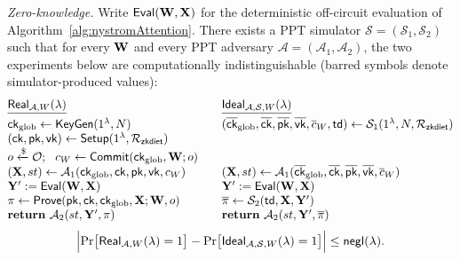 \documentclass[runningheads]{llncs}
\begin{document}
\noindent\emph{Zero-knowledge.}
Write $\mathsf{Eval}({\mathbf{W}}, {\mathbf{X}})$ for the deterministic off-circuit evaluation of Algorithm~\ref{alg:nystromAttention}. There exists a PPT simulator $\mathcal{S} = (\mathcal{S}_{1}, \mathcal{S}_{2})$ such that for every ${\mathbf{W}}$ and every PPT adversary $\mathcal{A} = (\mathcal{A}_{1}, \mathcal{A}_{2})$, the two experiments below are computationally indistinguishable (barred symbols denote simulator-produced values):
\[
\begin{array}{@{}l@{\qquad}l@{}}
\underline{\mathsf{Real}_{\mathcal{A}, W}(\lambda)} &
\underline{\mathsf{Ideal}_{\mathcal{A}, \mathcal{S}, W}(\lambda)} \\[4pt]
\mathsf{ck}_{\mathrm{glob}} \leftarrow \mathsf{KeyGen}(1^{\lambda}, N) &
(\overline{\mathsf{ck}}_{\mathrm{glob}}, \overline{\mathsf{ck}},
 \overline{\mathsf{pk}}, \overline{\mathsf{vk}}, \overline{c}_{W},
 \mathsf{td}) \leftarrow
 \mathcal{S}_{1}(1^{\lambda}, N, \mathcal{R}_{\mathsf{zkdiet}}) \\
(\mathsf{ck}, \mathsf{pk}, \mathsf{vk}) \leftarrow
 \mathsf{Setup}(1^{\lambda}, \mathcal{R}_{\mathsf{zkdiet}}) & \\
o \xleftarrow{\$} \mathcal{O};\ \
 c_{W} \leftarrow \mathsf{Commit}(\mathsf{ck}_{\mathrm{glob}}, \W; o) & \\
(\X, st) \leftarrow \mathcal{A}_{1}(\mathsf{ck}_{\mathrm{glob}},
 \mathsf{ck}, \mathsf{pk}, \mathsf{vk}, c_{W}) &
(\X, st) \leftarrow
 \mathcal{A}_{1}(\overline{\mathsf{ck}}_{\mathrm{glob}},
 \overline{\mathsf{ck}}, \overline{\mathsf{pk}},
 \overline{\mathsf{vk}}, \overline{c}_{W}) \\
\Y' := \mathsf{Eval}(\W, \X) &
\Y' := \mathsf{Eval}(\W, \X) \\
\pi \leftarrow \mathsf{Prove}(\mathsf{pk}, \mathsf{ck},
 \mathsf{ck}_{\mathrm{glob}}, \X; \W, o) &
\overline{\pi} \leftarrow \mathcal{S}_{2}(\mathsf{td}, \X,
 \Y') \\
\mathbf{return}\ \mathcal{A}_{2}(st, \Y', \pi) &
\mathbf{return}\ \mathcal{A}_{2}(st, \Y', \overline{\pi})
\end{array}
\]
\[
\Bigl| \Pr\bigl[\mathsf{Real}_{\mathcal{A}, W}(\lambda) = 1\bigr] -
       \Pr\bigl[\mathsf{Ideal}_{\mathcal{A}, \mathcal{S}, W}(\lambda) = 1\bigr]
\Bigr| \le \mathsf{negl}(\lambda).
\]
\end{document}
